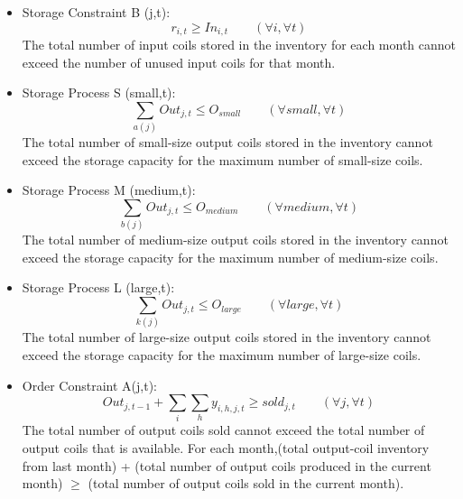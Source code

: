 \documentclass{article}[12pt]
\begin{document}
\begin{itemize}
\item Storage Constraint B (j,t):
\begin{displaymath}
r_{i,t} \geq In_{i,t} \qquad (\forall i, \forall t)
\end{displaymath}
The total number of input coils stored in the inventory for each month cannot exceed the number of unused input coils for that month. \\

\item Storage Process S (small,t):\\
\begin{displaymath}
\sum_{a(j)} Out_{j,t} \leq O_{small} \qquad (\forall small, \forall t)
\end{displaymath}
The total number of small-size output coils stored in the inventory cannot exceed the storage capacity for the maximum number of small-size coils. \\

\item Storage Process M (medium,t):
\begin{displaymath}
\sum_{b(j)} Out_{j,t} \leq O_{medium} \qquad (\forall medium, \forall t)
\end{displaymath}
The total number of medium-size output coils stored in the inventory cannot exceed the storage capacity for the maximum number of medium-size coils. \\

\item Storage Process L (large,t):
\begin{displaymath}
\sum_{k(j)} Out_{j,t} \leq O_{large} \qquad (\forall large, \forall t)
\end{displaymath}
The total number of large-size output coils stored in the inventory cannot exceed the storage capacity for the maximum number of large-size coils.\\

\item Order Constraint A(j,t):\\
\begin{displaymath}
Out_{j,t-1} + \sum_{i}\sum_{h} y_{i,h,j,t} \geq sold_{j,t} \qquad (\forall j, \forall t)
\end{displaymath}
The total number of output coils sold cannot exceed the total number of output coils that is available. For each month,(total output-coil inventory from last month) + (total number of output coils produced in the current month) $\ge$ (total number of output coils sold in the current month). \\


\end{itemize}
\end{document}
